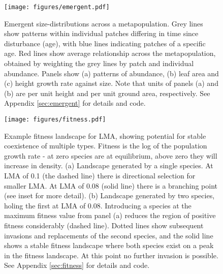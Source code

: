 \documentclass[a4paper,11pt]{article}
\begin{document}
\newpage

\begin{figure}[h!]
\centering
\texttt{[image: figures/emergent.pdf]}
\caption{Emergent size-distributions across a metapopulation.
Grey lines show patterns within individual patches differing in time
since disturbance (age), with blue lines indicating patches of a
specific age. Red lines show average relationship across the metapopulation, 
obtained by weighting the grey lines by patch and individual abundance. 
Panels show (a) patterns of abundance, (b) leaf area and
(c) height growth rate against size. Note that units of panels (a) and
(b) are per unit height and per unit ground area, respectively.  See Appendix \ref{sec:emergent} for details and code.}
\label{fig:emergent}
\end{figure}

\newpage

\begin{figure}[h!]
\centering
\texttt{[image: figures/fitness.pdf]}
\caption{Example fitness landscape for LMA, showing potential for stable
coexistence of multiple types.  Fitness is the log of the population growth
rate - at zero species are at equilibrium, above zero they will increase in
density.  (a) Landscape generated by a single species.  At LMA of 0.1 (the
dashed line) there is directional selection for smaller LMA.  At LMA of 0.08
(solid line) there is a branching point (see inset for more detail).  (b)
Landscape generated by two species, holing the first at LMA of 0.08.
Introducing a species at the maximum fitness value from panel (a) reduces the
region of positive fitness considerably (dashed line).  Dotted lines show
subsequent invasions and replacements of the second species, and the solid
line shows a stable fitness landscape where both species exist on a peak in
the fitness landscape.  At this point no further invasion is
possible.  See Appendix \ref{sec:fitness} for details and code.}
\label{fig:fitness}
\end{figure}

\clearpage
\setcounter{secnumdepth}{1}
\end{document}
